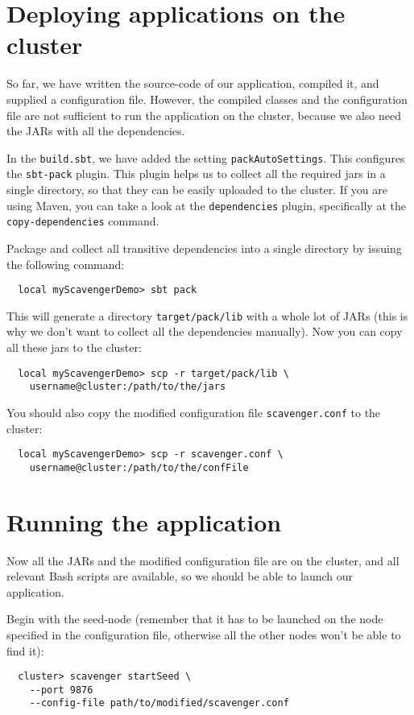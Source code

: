 \documentclass{scrbook}
\begin{document}
\section{Deploying applications on the cluster}
So far, we have written the source-code of our application, compiled it, 
and supplied a configuration file. However, the compiled classes and the 
configuration file are not sufficient to run the application on the cluster,
because we also need the JARs with all the dependencies.

In the \lstinline{build.sbt}, we have added the setting
\lstinline{packAutoSettings}. 
This configures the \lstinline{sbt-pack} plugin.
This plugin helps us to collect all the required jars in a single directory,
so that they can be easily uploaded to the cluster. If you are using Maven,
you can take a look at the \lstinline{dependencies} plugin, specifically at
the \lstinline{copy-dependencies} command.

Package and collect all transitive dependencies into a single 
directory by issuing the following command:
\begin{lstlisting}
  local myScavengerDemo> sbt pack
\end{lstlisting}
This will generate a directory \lstinline{target/pack/lib} with a whole lot of
JARs (this is why we don't want to collect all the
dependencies manually). Now you can copy all these jars to the cluster:
\begin{lstlisting}
  local myScavengerDemo> scp -r target/pack/lib \
    username@cluster:/path/to/the/jars
\end{lstlisting}
You should also copy the modified configuration file
\lstinline{scavenger.conf} to the cluster:
\begin{lstlisting}
  local myScavengerDemo> scp -r scavenger.conf \
    username@cluster:/path/to/the/confFile
\end{lstlisting}

\section{Running the application}
Now all the JARs and the modified configuration file are on the cluster, 
and all relevant Bash scripts are available, 
so we should be able to launch our application.

Begin with the seed-node (remember that it has to be launched 
on the node specified in the configuration file, otherwise
all the other nodes won't be able to find it):
\begin{lstlisting}
  cluster> scavenger startSeed \
    --port 9876
    --config-file path/to/modified/scavenger.conf
\end{lstlisting}
\end{document}
